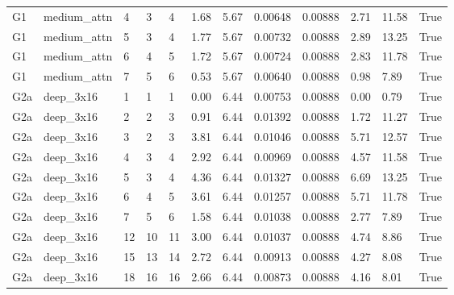 \documentclass[10pt,a4paper]{article}
\begin{document}
\begin{landscape}
\begin{tiny}
\begin{longtable}{llllllllllll}
G1 & medium\_attn & 4 & 3 & 4 & 1.68 & 5.67 & 0.00648 & 0.00888 & 2.71 & 11.58 & True \\
G1 & medium\_attn & 5 & 3 & 4 & 1.77 & 5.67 & 0.00732 & 0.00888 & 2.89 & 13.25 & True \\
G1 & medium\_attn & 6 & 4 & 5 & 1.72 & 5.67 & 0.00724 & 0.00888 & 2.83 & 11.78 & True \\
G1 & medium\_attn & 7 & 5 & 6 & 0.53 & 5.67 & 0.00640 & 0.00888 & 0.98 & 7.89 & True \\
G2a & deep\_3x16 & 1 & 1 & 1 & 0.00 & 6.44 & 0.00753 & 0.00888 & 0.00 & 0.79 & True \\
G2a & deep\_3x16 & 2 & 2 & 3 & 0.91 & 6.44 & 0.01392 & 0.00888 & 1.72 & 11.27 & True \\
G2a & deep\_3x16 & 3 & 2 & 3 & 3.81 & 6.44 & 0.01046 & 0.00888 & 5.71 & 12.57 & True \\
G2a & deep\_3x16 & 4 & 3 & 4 & 2.92 & 6.44 & 0.00969 & 0.00888 & 4.57 & 11.58 & True \\
G2a & deep\_3x16 & 5 & 3 & 4 & 4.36 & 6.44 & 0.01327 & 0.00888 & 6.69 & 13.25 & True \\
G2a & deep\_3x16 & 6 & 4 & 5 & 3.61 & 6.44 & 0.01257 & 0.00888 & 5.71 & 11.78 & True \\
G2a & deep\_3x16 & 7 & 5 & 6 & 1.58 & 6.44 & 0.01038 & 0.00888 & 2.77 & 7.89 & True \\
G2a & deep\_3x16 & 12 & 10 & 11 & 3.00 & 6.44 & 0.01037 & 0.00888 & 4.74 & 8.86 & True \\
G2a & deep\_3x16 & 15 & 13 & 14 & 2.72 & 6.44 & 0.00913 & 0.00888 & 4.27 & 8.08 & True \\
G2a & deep\_3x16 & 18 & 16 & 16 & 2.66 & 6.44 & 0.00873 & 0.00888 & 4.16 & 8.01 & True \\
\bottomrule \end{longtable}
\end{tiny}
\end{landscape}
\end{document}
